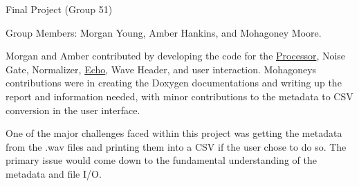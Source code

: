 Final Project (Group 51)


\begin{DoxyEnumerate}
\item Group Members\+: Morgan Young, Amber Hankins, and Mohagoney Moore.
\item Morgan and Amber contributed by developing the code for the \hyperlink{classProcessor}{Processor}, Noise Gate, Normalizer, \hyperlink{classEcho}{Echo}, Wave Header, and user interaction. Mohagoney\textquotesingle{}s contributions were in creating the Doxygen documentations and writing up the report and information needed, with minor contributions to the metadata to C\+SV conversion in the user interface.
\item 
\item One of the major challenges faced within this project was getting the metadata from the .wav files and printing them into a C\+SV if the user chose to do so. The primary issue would come down to the fundamental understanding of the metadata and file I/O. 
\end{DoxyEnumerate}